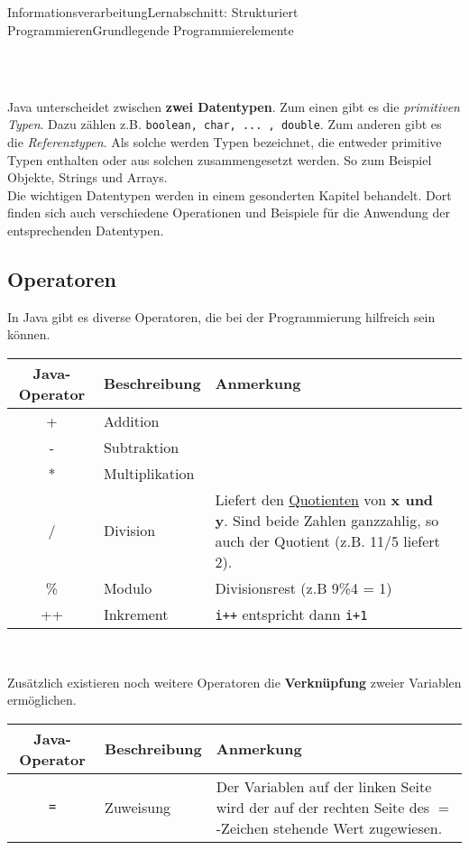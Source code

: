 \documentclass[11pt,oneside,openany,headings=optiontotoc,11pt,numbers=noenddot]{article}
\begin{document}
\begin{worksheet}{Informationsverarbeitung}{Lernabschnitt: Strukturiert Programmieren}{Grundlegende Programmierelemente}
\begin{tabularx}{\textwidth}{lXX}
			\hline
			\hline
		\end{tabularx}\\
		\par\noindent
		Java unterscheidet zwischen \textbf{zwei Datentypen}. Zum einen gibt es die \textit{primitiven Typen}. Dazu zählen z.B. \lstinline[style=JavaInputStyle]{boolean, char, ... , double}. Zum anderen gibt es die \textit{Referenztypen}. Als solche werden Typen bezeichnet, die entweder primitive Typen enthalten oder aus solchen zusammengesetzt werden. So zum Beispiel Objekte, Strings und Arrays.\\
		Die wichtigen Datentypen werden in einem gesonderten Kapitel behandelt. Dort finden sich auch verschiedene Operationen und Beispiele für die Anwendung der entsprechenden Datentypen.
		\subsection{Operatoren}
		In Java gibt es diverse Operatoren, die bei der Programmierung hilfreich sein können.\\
		\par\noindent
		\begin{tabularx}{\textwidth}{clXX}
			\textbf{Java-Operator} & \textbf{Beschreibung} & \textbf{Anmerkung}\\
			\hline
			\hline
			+ & Addition & \\
			\hline
			- & Subtraktion & \\
			\hline
			* & Multiplikation & \\
			\hline
			/ & Division & Liefert den \underline{Quotienten} von \textbf{x und y}. Sind beide Zahlen ganzzahlig, so auch der Quotient (z.B. 11/5 liefert 2).\\
			\hline
			\% & Modulo & Divisionsrest (z.B 9\%4 = 1)\\
			\hline
			++ & Inkrement & {\lstinline[style=JavaInputStyle]{i++}} entspricht dann {\lstinline[style=JavaInputStyle]{i+1}}\\
			\hline
			\hline
		\end{tabularx}\\
		\par\noindent
		Zusätzlich existieren noch weitere Operatoren die \textbf{Verknüpfung} zweier Variablen ermöglichen.\\
		\begin{tabularx}{\textwidth}{cXX}
			\textbf{Java-Operator} & \textbf{Beschreibung} & \textbf{Anmerkung}\\
			\hline
			\hline
			{\lstinline[style=JavaInputStyle]{=}} & Zuweisung & Der Variablen auf der linken Seite wird der auf der rechten Seite des \(=\)-Zeichen stehende Wert zugewiesen.\\

\end{tabularx}
\end{worksheet}
\end{document}

